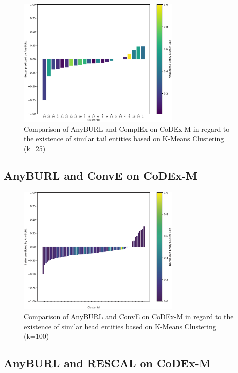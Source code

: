 \begin{figure}[H]
\centering
\includegraphics[width=0.7\textwidth]{images/tail_cluster_25_anyburl_complex_codex.PNG}
\caption{Comparison of AnyBURL and ComplEx on CoDEx-M in regard to the existence of similar tail entities based on K-Means Clustering (k=25)}
\label{fig:tail_cluster_25_anyburl_complex_codex}
\end{figure}



\subsection{AnyBURL and ConvE on CoDEx-M}

\begin{figure}[H]
\centering
\includegraphics[width=0.7\textwidth]{images/head_cluster_100_anyburl_conve_codex.PNG}
\caption{Comparison of AnyBURL and ConvE on CoDEx-M in regard to the existence of similar head entities based on K-Means Clustering (k=100)}
\label{fig:head_cluster_100_anyburl_conve_codex}
\end{figure}


\subsection{AnyBURL and RESCAL on CoDEx-M}


